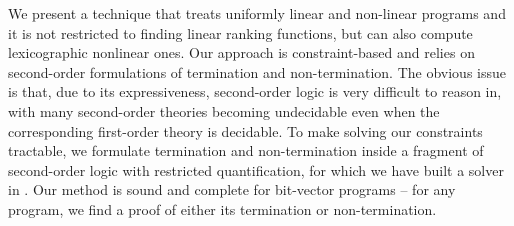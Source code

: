 \documentclass[a4paper]{llncs}
\begin{document}
We present a technique that treats uniformly linear and non-linear programs and
it is not restricted to finding linear ranking functions, but can
also compute lexicographic nonlinear ones. 
Our approach is constraint-based and relies on second-order formulations 
of termination and non-termination.
The obvious issue is that,
due to its expressiveness, second-order logic is very difficult to reason
in, with many second-order theories becoming undecidable even when the
corresponding first-order theory is decidable.
To make solving our constraints tractable, we formulate termination and non-termination inside a fragment of second-order logic with restricted quantification, 
for which we have built a solver in \cite{}.
Our method is sound and
complete for bit-vector programs -- for any program, we find
a proof of either its termination or non-termination.





% 
\end{document}
